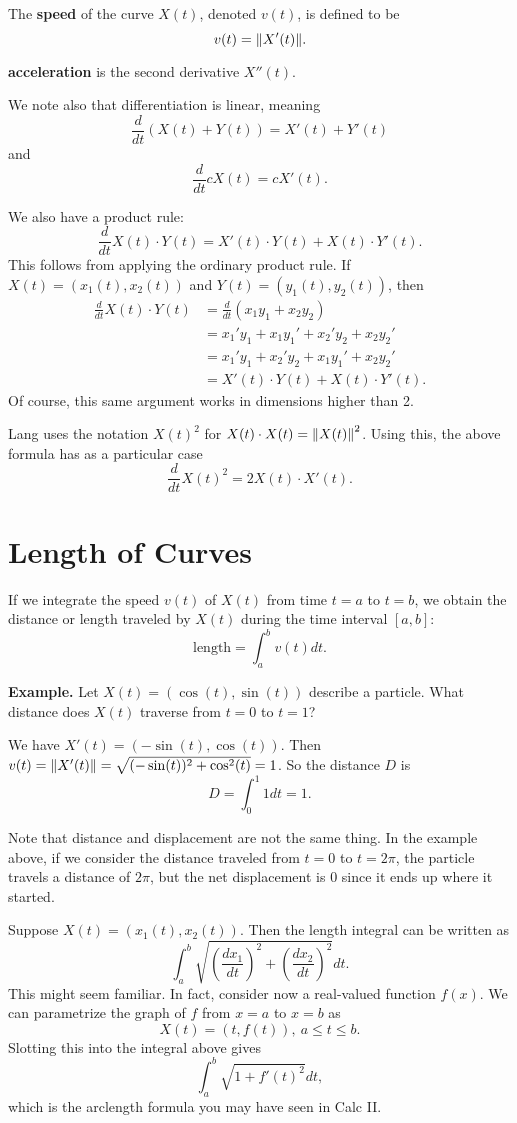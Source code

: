 \documentclass{article}
\begin{document}
The \textbf{speed} of the curve $X(t)$, denoted $v(t)$, is defined to be 
\[v(t) = \norm{X'(t)}.\]

\textbf{acceleration} is the second derivative $X''(t)$.

We note also that differentiation is linear, meaning
\[\frac{d}{dt} \left( X(t) + Y(t) \right) = X'(t) + Y'(t)\]
and 
\[\frac{d}{dt} cX(t) = cX'(t).\]

We also have a product rule:
\[\frac{d}{dt} X(t) \cdot Y(t) = X'(t)\cdot Y(t) + X(t) \cdot Y'(t).\]
This follows from applying the ordinary product rule. If $X(t) = (x_1(t), x_2(t))$ and
$Y(t) = (y_1(t), y_2(t))$, then
\begin{align*}
    \frac{d}{dt} X(t) \cdot Y(t) &= \frac{d}{dt} (x_1y_1 + x_2y_2)\\
    &= x_1'y_1 + x_1y_1' + x_2'y_2 + x_2y_2'\\
    &= x_1'y_1 + x_2'y_2 + x_1y_1' + x_2y_2'\\
    &= X'(t)\cdot Y(t) + X(t) \cdot Y'(t).
\end{align*}
Of course, this same argument works in dimensions higher than 2.

Lang uses the notation $X(t)^2$ for $X(t)\cdot X(t)=\norm{X(t)}^2$. Using this, the above formula
has as a particular case
\[\frac{d}{dt} X(t)^2 = 2 X(t)\cdot X'(t). \]
\section*{Length of Curves}
If we integrate the speed $v(t)$ of $X(t)$ from time $t=a$ to $t=b$,
we obtain the distance or length traveled by $X(t)$ during the time interval $[a,b]$:
\[\text{length} = \int_a^b v(t)dt.\]

\textbf{Example.} Let $X(t) = (\cos(t), \sin(t))$ describe a particle.
What distance does $X(t)$ traverse from $t=0$ to $t=1$?

We have $X'(t)=(-\sin(t), \cos(t))$. Then $v(t) = \norm{X'(t)} 
= \sqrt{(-\sin(t))^2 + \cos^2(t)} = 1$. So the distance $D$ is 
\[D = \int_0^1 1 dt = 1.\]

Note that distance and displacement are not the same thing. In the example above,
if we consider the distance traveled from $t=0$ to $t=2\pi$, the particle
travels a distance of $2\pi$, but the net displacement is $0$ since it
ends up where it started.

Suppose $X(t) = (x_1(t), x_2(t))$. Then the length integral can be written as
\[\int_a^b \sqrt{\left( \frac{dx_1}{dt} \right)^2+ \left( \frac{dx_2}{dt} \right)^2}dt.\]
This might seem familiar. In fact, consider now a real-valued function $f(x)$. We can parametrize 
the graph of $f$ from $x=a$ to $x=b$ as 
\[X(t) = (t,f(t)),\ a\leq t \leq b.\]
Slotting this into the integral above gives
\[\int_a^b \sqrt{1+f'(t)^2}dt,\]
which is the arclength formula you may have seen in Calc II.
\end{document}

